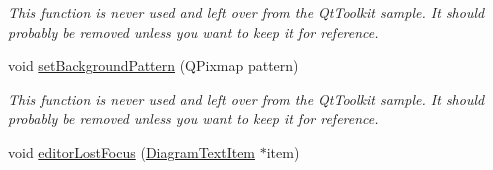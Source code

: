 \begin{DoxyCompactItemize}
\begin{DoxyCompactList}\small\item\em This function is never used and left over from the Qt\-Toolkit sample. It should probably be removed unless you want to keep it for reference. \end{DoxyCompactList}\item 
\hypertarget{class_diagram_scene_a886b38fb6a6709e95167f8aeef6f4da7}{void \hyperlink{class_diagram_scene_a886b38fb6a6709e95167f8aeef6f4da7}{set\-Background\-Pattern} (Q\-Pixmap pattern)}\label{class_diagram_scene_a886b38fb6a6709e95167f8aeef6f4da7}

\begin{DoxyCompactList}\small\item\em This function is never used and left over from the Qt\-Toolkit sample. It should probably be removed unless you want to keep it for reference. \end{DoxyCompactList}\item 
\hypertarget{class_diagram_scene_ae2081d68dfe8931bf47aa9e9ecf6807c}{void \hyperlink{class_diagram_scene_ae2081d68dfe8931bf47aa9e9ecf6807c}{editor\-Lost\-Focus} (\hyperlink{class_diagram_text_item}{Diagram\-Text\-Item} $\ast$item)}\label{class_diagram_scene_ae2081d68dfe8931bf47aa9e9ecf6807c}


\end{DoxyCompactItemize}
